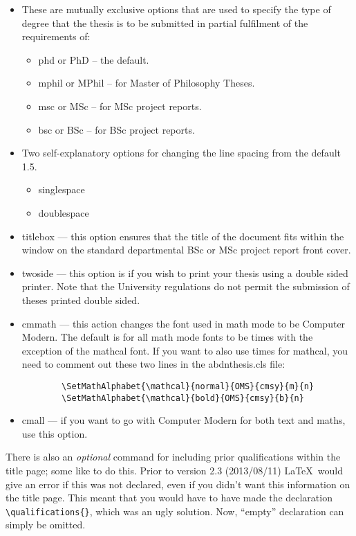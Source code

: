 \begin{itemize}

\item These are mutually exclusive options that are used to specify
 the type of degree that the thesis is to be submitted in partial
 fulfilment of the requirements of:

\begin{itemize}
\item phd or PhD -- the default.
\item mphil or MPhil -- for Master of Philosophy Theses.
\item msc or MSc -- for MSc project reports.
\item bsc or BSc -- for BSc project reports.
\end{itemize}

\item Two self-explanatory options for changing the line spacing from
 the default 1.5.

\begin{itemize}
\item singlespace
\item doublespace
\end{itemize}

\item titlebox --- this option ensures that the title of the document
 fits within the window on the standard departmental BSc or MSc
 project report front cover.
 
\item twoside --- this option is if you wish to print your thesis
  using a double sided printer.  Note that the University regulations 
  do not permit the submission of theses printed double sided.

\item cmmath --- this action changes the font used in math mode to be
  Computer Modern. The default is for all math mode fonts to be times
  with the exception of the mathcal font. If you want to also use
  times for mathcal, you need to comment out these two lines in the
  abdnthesis.cls file:
\begin{verbatim}
        \SetMathAlphabet{\mathcal}{normal}{OMS}{cmsy}{m}{n}
        \SetMathAlphabet{\mathcal}{bold}{OMS}{cmsy}{b}{n}
\end{verbatim}

\item cmall --- if you want to go with Computer Modern for both
  text and maths, use this option.
\end{itemize}

There is also an \emph{optional} command for including prior
qualifications within the title page; some like to do this. Prior to
version 2.3 (2013/08/11) \LaTeX\ would give an error if this was not
declared, even if you didn't want this information on the title
page. This meant that you would have to have made the declaration
\verb+\qualifications{}+, which was an ugly solution. Now, ``empty''
declaration can simply be omitted.



